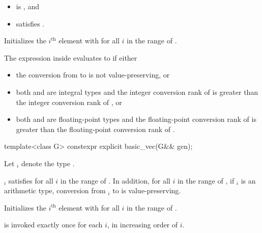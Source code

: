\begin{itemdescr}
\pnum
\constraints
\begin{itemize}
\item {} is , and
\item {} satisfies .
\end{itemize}

\pnum
\effects
Initializes the $i^\text{th}$ element with  for
all $i$ in the range of .

\pnum
\remarks
The expression inside  evaluates to  if either
\begin{itemize}
 \item
   the conversion from  to  is not value-preserving,
   or
 \item
   both  and  are integral types and the integer
   conversion rank of  is greater than the integer
   conversion rank of , or
 \item
   both  and  are floating-point types and the
   floating-point conversion rank of  is greater than
   the floating-point conversion rank of .
\end{itemize}
\end{itemdescr}

\begin{itemdecl}
template<class G> constexpr explicit basic_vec(G&& gen);
\end{itemdecl}

\begin{itemdescr}
\pnum
Let $_i$ denote the type
.

\pnum
\constraints
{}$_i$ satisfies  for all $i$ in
the range of .
In addition, for all $i$ in the range of , if $_i$
is an arithmetic type, conversion from $_i$ to 
is value-preserving.

\pnum
\effects
Initializes the $i^\text{th}$ element with
 for all $i$ in the range of .

\pnum
\remarks
{} is invoked exactly once for each $i$, in increasing order of $i$.
\end{itemdescr}

